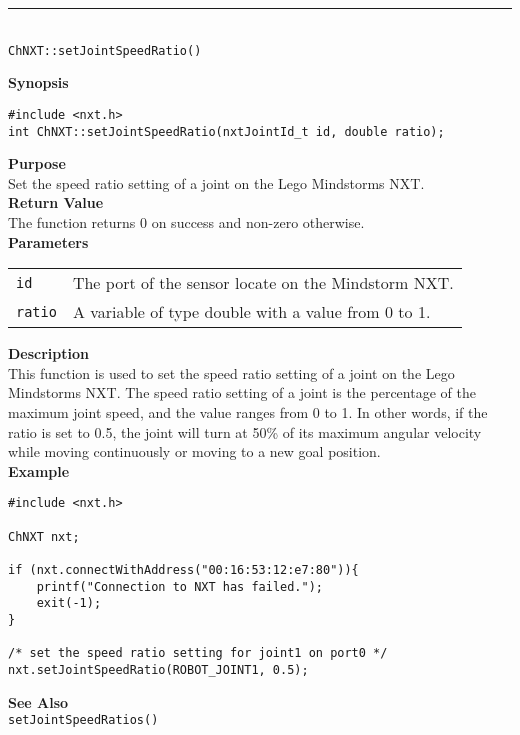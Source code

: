 \noindent
\vspace{5pt}
\rule{4.5in}{0.015in}\\
\noindent
{\LARGE \texttt{ChNXT::setJointSpeedRatio()} }\\


\noindent
{\bf Synopsis}
\vspace{-8pt}
\begin{verbatim}
#include <nxt.h>
int ChNXT::setJointSpeedRatio(nxtJointId_t id, double ratio);
\end{verbatim}

\noindent
{\bf Purpose}\\
Set the speed ratio setting of a joint on the Lego Mindstorms NXT.\\

\noindent
{\bf Return Value}\\
The function returns 0 on success and non-zero otherwise.\\

\noindent
{\bf Parameters}\\
\vspace{-0.1in}
\begin{description}
\item
\begin{tabular}{ p{20mm}p{135mm} }
\texttt{id}&The port of the sensor locate on the Mindstorm NXT.\\
\texttt{ratio}&A variable of type double with a value from 0 to 1.\\
\end{tabular}
\end{description}

\noindent
{\bf Description}\\
This function is used to set the speed ratio setting of a joint on
the Lego Mindstorms NXT. The speed ratio setting of a joint is the
percentage of the maximum joint speed, and the value ranges from 
0 to 1. In other words, if the ratio is set to 0.5, the joint will
turn at 50\% of its maximum angular velocity while moving 
continuously or moving to a new goal position.\\

\noindent
{\bf Example}
\begin{verbatim}
#include <nxt.h> 

ChNXT nxt;

if (nxt.connectWithAddress("00:16:53:12:e7:80")){
    printf("Connection to NXT has failed.");
    exit(-1);
}
    
/* set the speed ratio setting for joint1 on port0 */
nxt.setJointSpeedRatio(ROBOT_JOINT1, 0.5);
\end{verbatim}
\noindent
{\bf See Also}\\
\texttt{setJointSpeedRatios()}\\

